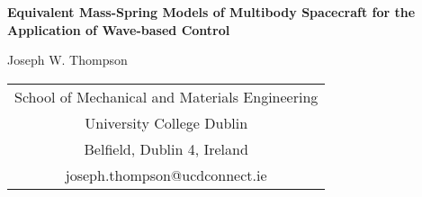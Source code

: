 \documentclass{mbd_fullpaper}
\begin{document}
\newcommand{\heading}[1]{
   {\medskip\hskip5em\bf\large{#1}
   \vskip0.5ex
   }
}
\newcommand{\eqnref}[1]{
  (\ref{#1})
}

\renewcommand{\refname}{\medskip\bf\large References}



\begin{center}
  \Large{\bf
Equivalent Mass-Spring Models of Multibody Spacecraft for the Application of Wave-based Control  }
\end{center}

\begin{center}
\large{
Joseph W. Thompson
}
\end{center}

{
\begin{center}
 \small
  \begin{tabular}{c}
    School of Mechanical and Materials Engineering \\
    University College Dublin              \\
    Belfield, Dublin 4, Ireland        \\
    joseph.thompson@ucdconnect.ie                        \\
  \end{tabular}
\end{center}
}

\end{document}
